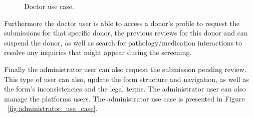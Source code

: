 \begin{figure}[h]
\begin{center}
	\end{center}
	\caption{Doctor use case.}\label{fig:doctor_use_case}
\end{figure}

Furthermore the doctor user is able to access a donor's profile to request the submissions for that specific donor, the previous reviews for this donor and can suspend the donor, as well as search for pathology/medication interactions to resolve any inquiries that might appear during the screening.

\newpage

Finally the administrator user can also request the submission pending review.
This type of user can also, update the form structure and navigation, as well as the form's inconsistencies and the legal terms.
The administrator user can also manage the platforms users.
The administrator use case is presented in Figure ~\ref{fig:administrator_use_case}.
